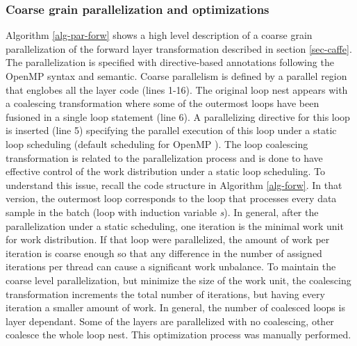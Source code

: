 \subsubsection{Coarse grain parallelization and optimizations}
Algorithm \ref{alg-par-forw} shows a high level description of a 
coarse grain parallelization of the forward layer transformation 
described in section \ref{sec-caffe}. The parallelization is specified 
with directive-based annotations following the OpenMP syntax and semantic. 
Coarse parallelism is defined by a parallel region that englobes all the 
layer code (lines 1-16). The original loop nest appears with a coalescing 
transformation where some of the outermost loops have been fusioned in a 
single loop statement (line 6). A parallelizing directive for this loop 
is inserted (line 5) specifying the parallel execution of this loop 
under a static loop scheduling (default scheduling for OpenMP \cite{Open-MP}). 
The loop coalescing transformation is related to the parallelization 
process and is done to have effective control of the work distribution 
under a static loop scheduling. To understand this issue, recall the 
code structure in Algorithm \ref{alg-forw}. In that version, the outermost 
loop corresponds to the loop that processes every data sample in the 
batch (loop with induction variable \emph{s}). In general, after the 
parallelization under a static scheduling, one iteration is the minimal 
work unit for work distribution. If that loop were parallelized, the 
amount of work per iteration is coarse enough so that any difference 
in the number of assigned iterations per thread can cause a significant  
work unbalance. To maintain the coarse level parallelization, but minimize 
the size of the work unit, the coalescing transformation increments the 
total number of iterations, but having every iteration a smaller 
amount of work. In general, the number of coalesced loops is layer 
dependant. Some of the layers are parallelized with no coalescing, 
other coalesce the whole loop nest. This optimization process was 
manually performed.


